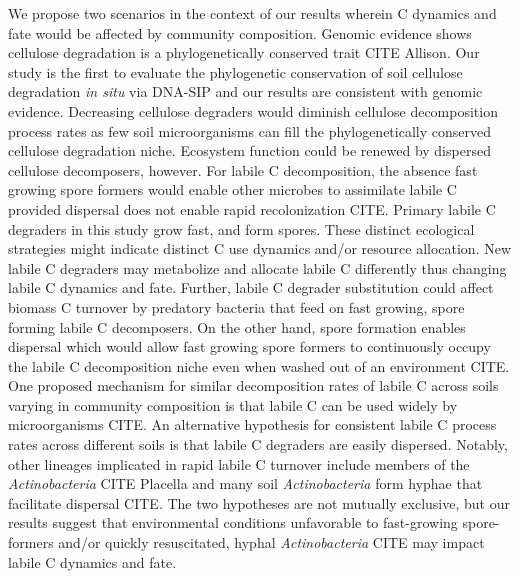We propose two scenarios in the context of our results wherein C dynamics and
fate would be affected by community composition. Genomic evidence shows
cellulose degradation is a phylogenetically conserved trait CITE Allison. Our
study is the first to evaluate the phylogenetic conservation of soil cellulose
degradation \textit{in situ} via DNA-SIP and our results are consistent with
genomic evidence. Decreasing cellulose degraders would diminish cellulose
decomposition process rates as few soil microorganisms can fill the
phylogenetically conserved cellulose degradation niche. Ecosystem function
could be renewed by dispersed cellulose decomposers, however. For labile
C decomposition, the absence fast growing spore formers would enable other
microbes to assimilate labile C provided dispersal does not enable rapid
recolonization CITE. Primary labile C degraders in this study grow fast, and
form spores. These distinct ecological strategies might indicate distinct
C use dynamics and/or resource allocation. New labile C degraders may
metabolize and allocate labile C differently thus changing labile C dynamics
and fate. Further, labile C degrader substitution could affect biomass
C turnover by predatory bacteria that feed on fast growing, spore forming
labile C decomposers. On the other hand, spore formation enables dispersal
which would allow fast growing spore formers to continuously occupy the labile
C decomposition niche even when washed out of an environment CITE. One proposed
mechanism for similar decomposition rates of labile C across soils varying in
community composition is that labile C can be used widely by microorganisms
CITE. An alternative hypothesis for consistent labile C process rates across
different soils is that labile C degraders are easily dispersed. Notably, other
lineages implicated in rapid labile C turnover include members of the
\textit{Actinobacteria} CITE Placella and many soil \textit{Actinobacteria}
form hyphae that facilitate dispersal CITE. The two hypotheses are not mutually
exclusive, but our results suggest that environmental conditions unfavorable to
fast-growing spore-formers and/or quickly resuscitated, hyphal
\textit{Actinobacteria} CITE may impact labile C dynamics and fate.

